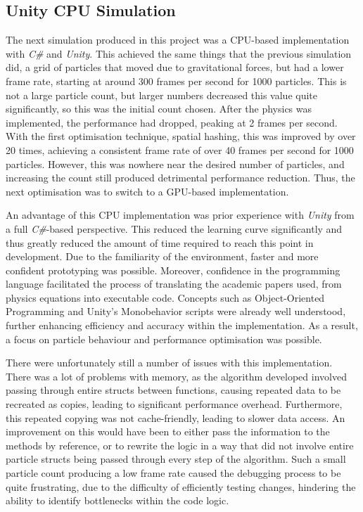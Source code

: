 \documentclass[12pt]{article}
\begin{document}
    \subsection{Unity CPU Simulation}

    The next simulation produced in this project was a CPU-based implementation with \textit{C\#} and \textit{Unity}. This achieved the same things that the previous simulation did, a grid of particles that moved due to gravitational forces, but had a lower frame rate, starting at around 300 frames per second for 1000 particles. This is not a large particle count, but larger numbers decreased this value quite significantly, so this was the initial count chosen. After the physics was implemented, the performance had dropped, peaking at 2 frames per second. With the first optimisation technique, spatial hashing, this was improved by over 20 times, achieving a consistent frame rate of over 40 frames per second for 1000 particles. However, this was nowhere near the desired number of particles, and increasing the count still produced detrimental performance reduction. Thus, the next optimisation was to switch to a GPU-based implementation.

    An advantage of this CPU implementation was prior experience with \textit{Unity} from a full \textit{C\#}-based perspective. This reduced the learning curve significantly and thus greatly reduced the amount of time required to reach this point in development. Due to the familiarity of the environment, faster and more confident prototyping was possible. Moreover, confidence in the programming language facilitated the process of translating the academic papers used, from physics equations into executable code. Concepts such as Object-Oriented Programming and Unity's Monobehavior scripts were already well understood, further enhancing efficiency and accuracy within the implementation. As a result, a focus on particle behaviour and performance optimisation was possible.

    There were unfortunately still a number of issues with this implementation. There was a lot of problems with memory, as the algorithm developed involved passing through entire structs between functions, causing repeated data to be recreated as copies, leading to significant performance overhead. Furthermore, this repeated copying was not cache-friendly, leading to slower data access. An improvement on this would have been to either pass the information to the methods by reference, or to rewrite the logic in a way that did not involve entire particle structs being passed through every step of the algorithm. Such a small particle count producing a low frame rate caused the debugging process to be quite frustrating, due to the difficulty of efficiently testing changes, hindering the ability to identify bottlenecks within the code logic. 
    
\end{document}
